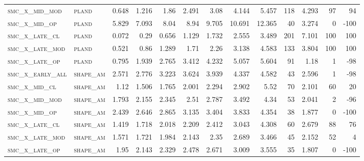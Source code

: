 \begin{landscape}
\begin{center}
\begin{footnotesize}
\begin{longtable}{llrrrrrrrr|rrr}
\textsc{smc\_x\_mid\_mod  } & \textsc{pland     }   & 0.648    & 1.216    & 1.86     & 2.491    & 3.08     & 4.144    & 5.457    & 118    & 4.293         & 97            & 94              \\
\textsc{smc\_x\_mid\_op   } & \textsc{pland     }   & 5.829    & 7.093    & 8.04     & 8.94     & 9.705    & 10.691   & 12.365   & 40     & 3.274         & 0             & -100            \\
\textsc{smc\_x\_late\_cl  } & \textsc{pland     }   & 0.072    & 0.29     & 0.656    & 1.129    & 1.732    & 2.555    & 3.489    & 201    & 7.101         & 100           & 100             \\
\textsc{smc\_x\_late\_mod } & \textsc{pland     }   & 0.521    & 0.86     & 1.289    & 1.71     & 2.26     & 3.138    & 4.583    & 133    & 3.804         & 100           & 100             \\
\textsc{smc\_x\_late\_op  } & \textsc{pland     }   & 0.795    & 1.939    & 2.765    & 3.412    & 4.232    & 5.057    & 5.604    & 91     & 1.18          & 1             & -98             \\
\textsc{smc\_x\_early\_all} & \textsc{shape\_am }   & 2.571    & 2.776    & 3.223    & 3.624    & 3.939    & 4.337    & 4.582    & 43     & 2.596         & 1             & -98             \\
\textsc{smc\_x\_mid\_cl   } & \textsc{shape\_am }   & 1.12     & 1.506    & 1.765    & 2.001    & 2.294    & 2.902    & 5.52     & 70     & 2.101         & 60            & 20              \\
\textsc{smc\_x\_mid\_mod  } & \textsc{shape\_am }   & 1.793    & 2.155    & 2.345    & 2.51     & 2.787    & 3.492    & 4.34     & 53     & 2.041         & 2             & -96             \\
\textsc{smc\_x\_mid\_op   } & \textsc{shape\_am }   & 2.439    & 2.646    & 2.865    & 3.135    & 3.404    & 3.833    & 4.354    & 38     & 1.877         & 0             & -100            \\
\textsc{smc\_x\_late\_cl  } & \textsc{shape\_am }   & 1.419    & 1.718    & 2.018    & 2.209    & 2.412    & 3.043    & 4.308    & 60     & 2.679         & 88            & 76              \\
\textsc{smc\_x\_late\_mod } & \textsc{shape\_am }   & 1.571    & 1.721    & 1.984    & 2.143    & 2.35     & 2.689    & 3.466    & 45     & 2.152         & 52            & 4               \\
\textsc{smc\_x\_late\_op  } & \textsc{shape\_am }   & 1.95     & 2.143    & 2.329    & 2.478    & 2.671    & 3.009    & 3.555    & 35     & 1.807         & 0             & -100            \\

\end{longtable}
\end{footnotesize}
\end{center}
\end{landscape}
